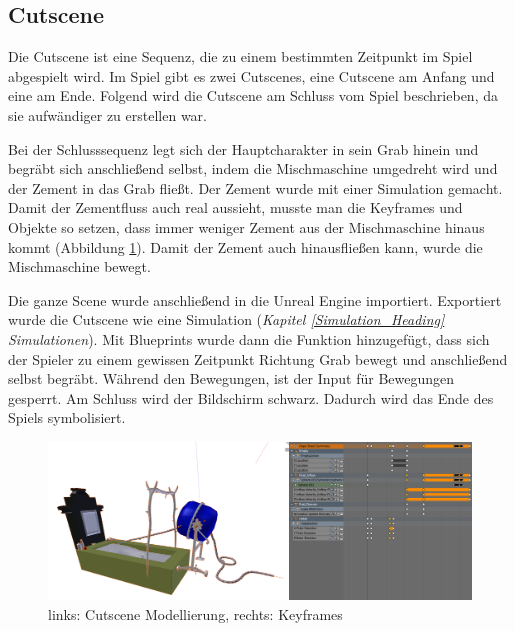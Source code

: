 \subsection{Cutscene}

Die Cutscene ist eine Sequenz, die zu einem bestimmten Zeitpunkt im Spiel abgespielt wird.
Im Spiel gibt es zwei Cutscenes, eine Cutscene am Anfang und eine am Ende. Folgend wird die Cutscene
am Schluss vom Spiel beschrieben, da sie aufwändiger zu erstellen war.

Bei der Schlusssequenz legt sich der Hauptcharakter in sein Grab hinein und begräbt sich anschließend selbst, indem
die Mischmaschine umgedreht wird und der Zement in das Grab fließt. Der Zement wurde mit einer Simulation gemacht.
Damit der Zementfluss auch real aussieht, musste man die Keyframes und Objekte so setzen, dass immer weniger Zement aus
der Mischmaschine hinaus kommt (Abbildung \ref{cutscene:image_modellierung}). Damit der Zement auch hinausfließen kann, wurde die Mischmaschine bewegt.

Die ganze Scene wurde anschließend in die Unreal Engine importiert. Exportiert wurde die Cutscene wie eine Simulation (\textit{Kapitel \ref{Simulation_Heading} \dq Simulationen\dq}).
Mit Blueprints wurde dann die Funktion hinzugefügt, dass sich der
Spieler zu einem gewissen Zeitpunkt Richtung Grab bewegt und anschließend selbst begräbt. Während den Bewegungen, ist der Input für Bewegungen gesperrt.
Am Schluss wird der Bildschirm schwarz. Dadurch wird das Ende des Spiels symbolisiert.

\begin{figure}[h]
    \centering
    \includegraphics[width=.8\textwidth]{images/Cutscene_Modellierung.png}
    \caption{links: Cutscene Modellierung, rechts: Keyframes}
    \label{cutscene:image_modellierung}
\end{figure}